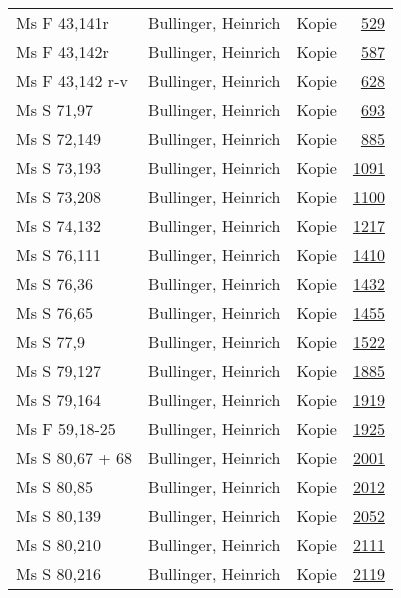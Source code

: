 \documentclass[10pt,a4paper,landscape]{report}
\begin{document}
\begin{longtable}{p{16cm}p{4cm}lr}
Ms F 43,141r	&	Bullinger, Heinrich	&	Kopie	&	\href{http://130.60.24.72/assignment/529}{529}\\
Ms F 43,142r	&	Bullinger, Heinrich	&	Kopie	&	\href{http://130.60.24.72/assignment/587}{587}\\
Ms F 43,142 r-v	&	Bullinger, Heinrich	&	Kopie	&	\href{http://130.60.24.72/assignment/628}{628}\\
Ms S 71,97	&	Bullinger, Heinrich	&	Kopie	&	\href{http://130.60.24.72/assignment/693}{693}\\
Ms S 72,149	&	Bullinger, Heinrich	&	Kopie	&	\href{http://130.60.24.72/assignment/885}{885}\\
Ms S 73,193	&	Bullinger, Heinrich	&	Kopie	&	\href{http://130.60.24.72/assignment/1091}{1091}\\
Ms S 73,208	&	Bullinger, Heinrich	&	Kopie	&	\href{http://130.60.24.72/assignment/1100}{1100}\\
Ms S 74,132	&	Bullinger, Heinrich	&	Kopie	&	\href{http://130.60.24.72/assignment/1217}{1217}\\
Ms S 76,111	&	Bullinger, Heinrich	&	Kopie	&	\href{http://130.60.24.72/assignment/1410}{1410}\\
Ms S 76,36	&	Bullinger, Heinrich	&	Kopie	&	\href{http://130.60.24.72/assignment/1432}{1432}\\
Ms S 76,65	&	Bullinger, Heinrich	&	Kopie	&	\href{http://130.60.24.72/assignment/1455}{1455}\\
Ms S 77,9	&	Bullinger, Heinrich	&	Kopie	&	\href{http://130.60.24.72/assignment/1522}{1522}\\
Ms S 79,127	&	Bullinger, Heinrich	&	Kopie	&	\href{http://130.60.24.72/assignment/1885}{1885}\\
Ms S 79,164	&	Bullinger, Heinrich	&	Kopie	&	\href{http://130.60.24.72/assignment/1919}{1919}\\
Ms F 59,18-25	&	Bullinger, Heinrich	&	Kopie	&	\href{http://130.60.24.72/assignment/1925}{1925}\\
Ms S 80,67 + 68	&	Bullinger, Heinrich	&	Kopie	&	\href{http://130.60.24.72/assignment/2001}{2001}\\
Ms S 80,85	&	Bullinger, Heinrich	&	Kopie	&	\href{http://130.60.24.72/assignment/2012}{2012}\\
Ms S 80,139	&	Bullinger, Heinrich	&	Kopie	&	\href{http://130.60.24.72/assignment/2052}{2052}\\
Ms S 80,210	&	Bullinger, Heinrich	&	Kopie	&	\href{http://130.60.24.72/assignment/2111}{2111}\\
Ms S 80,216	&	Bullinger, Heinrich	&	Kopie	&	\href{http://130.60.24.72/assignment/2119}{2119}\\

\end{longtable}
\end{document}
